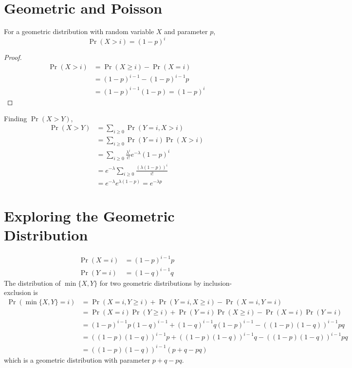 \documentclass{article}
\begin{document}
\newpage
\section{Geometric and Poisson}

\begin{lemma}
    For a geometric distribution with random variable \(X\) and parameter \(p\),
    \begin{equation}
        \Pr(X > i) = (1 - p)^i
    \end{equation}
\end{lemma}
\begin{proof}
    \begin{align}
        \Pr(X > i) &= \Pr(X \geqslant i) - \Pr(X = i) \\
        &= (1 - p)^{i - 1} - (1 - p)^{i - 1} p \\
        &= (1 - p)^{i - 1} (1 - p) = (1 - p)^i
    \end{align}
\end{proof}
Finding \(\Pr(X > Y)\),
\begin{align}
    \Pr(X > Y) &= \sum_{i \geqslant 0} \Pr(Y = i, X > i) \\
    &= \sum_{i \geqslant 0} \Pr(Y = i) \Pr(X > i) \\
    &= \sum_{i \geqslant 0} \frac{\lambda^i}{i!} e^{-\lambda} (1 - p)^i \\
    &= e^{-\lambda} \sum_{i \geqslant 0} \frac{(\lambda (1 - p))^i}{i!} \\
    &= e^{-\lambda} e^{\lambda (1 - p)} = e^{-\lambda p}
\end{align}

\section{Exploring the Geometric Distribution}

\begin{align}
    \Pr(X = i) &= (1 - p)^{i - 1} p \\
    \Pr(Y = i) &= (1 - q)^{i - 1} q
\end{align}
The distribution of \(\min\{X, Y\}\) for two geometric distributions by inclusion-exclusion is
\begin{align}
    \Pr(\min\{X, Y\} = i) &= \Pr(X = i, Y \geqslant i) + \Pr(Y = i, X \geqslant i) - \Pr(X = i, Y = i) \\
    &= \Pr(X = i) \Pr(Y \geqslant i) + \Pr(Y = i) \Pr(X \geqslant i) - \Pr(X = i) \Pr(Y = i) \\
    &= (1 - p)^{i - 1} p (1 - q)^{i - 1} + (1 - q)^{i - 1} q (1 - p)^{i - 1} - ((1 - p) (1 - q))^{i - 1} pq \\
    &= ((1 - p) (1 - q))^{i - 1} p + ((1 - p) (1 - q))^{i - 1} q - ((1 - p) (1 - q))^{i - 1} pq \\
    &= ((1 - p) (1 - q))^{i - 1} (p + q - pq)
\end{align}
which is a geometric distribution with parameter \(p + q - pq\).
\end{document}
